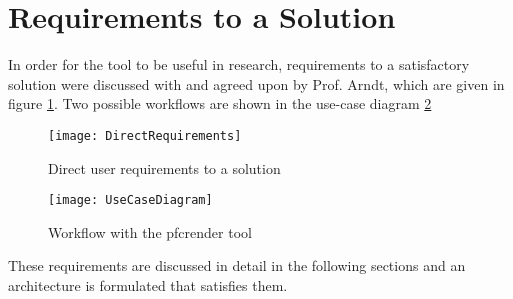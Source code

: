 \section{Requirements to a Solution}
In order for the tool to be useful in research, requirements to a satisfactory solution were discussed with and agreed upon by Prof. Arndt, which are given in figure \ref{fig:directreq}. Two possible workflows are shown in the use-case diagram \ref{fig:uc}

\begin{figure}[p]
	\texttt{[image: DirectRequirements]}
	\caption{Direct user requirements to a solution}
	\label{fig:directreq}
\end{figure}


\begin{figure}[p]
	\texttt{[image: UseCaseDiagram]}
	\caption{Workflow with the pfcrender tool}
	\label{fig:uc}
\end{figure}

These requirements are discussed in detail in the following sections and an architecture is formulated that satisfies them.
